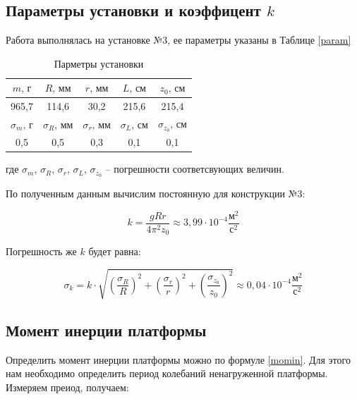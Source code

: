 \documentclass[a4paper,12pt]{article}
\begin{document}
	\subsection{Параметры установки и коэффицент $k$}
	
	Работа выполнялась на установке №3, ее параметры указаны в Таблице \eqref{param}
	\begin{table}[H]
	\begin{center}
		\begin{tabular}{|c|c|c|c|c|}
			\hline
			$m \text{, г}$  & $R\text{, мм}$ & $r\text{, мм}$ & $L\text{, см}$ & $z_0\text{, см}$\\
			\hline
			965,7 & 114,6 & 30,2 & 215,6 & 215,4\\
			\hline
			\hline
			$\sigma_m \text{, г}$  & $\sigma_R\text{, мм}$ & $\sigma_r\text{, мм}$ & $\sigma_L\text{, см}$ & $\sigma_{z_0}\text{, см}$\\
			\hline
			0,5 & 0,5 & 0,3 & 0,1 & 0,1\\
			\hline 
		\end{tabular}
	\caption{Парметры установки}
	\label{param}
	\end{center}
	\end{table}

	\noindent где $\sigma_m$, $\sigma_R$, $\sigma_r$, $\sigma_L$, $\sigma_{z_0}$ -- погрешности соответсвующих величин.
	
	\bigskip

	По полученным данным вычислим постоянную для конструкции №3:
	
	\begin{equation}
		k = \frac{gRr}{4\pi^2z_0} \approx 3,99\cdot 10^{-4} \frac{\text{м}^2}{\text{с}^2}
	\end{equation}

	Погрешность же $k$ будет равна:
	 
	\begin{equation}
	 	\sigma_k = k \cdot \sqrt{\left( \frac{\sigma_R}{R}\right)^2 + \left( \frac{\sigma_r}{r}\right)^2 + \left( \frac{\sigma_{z_0}}{z_0}\right)^2} \approx 0,04 \cdot 10^{-4} \frac{\text{м}^2}{\text{с}^2}
	\end{equation}
	 
	\subsection{Момент инерции платформы}
	 
	Определить момент инерции платформы можно по формуле \eqref{momin}. Для этого нам необходимо определить период колебаний ненагруженной платформы. Измеряем преиод, получаем:
	
\end{document}

